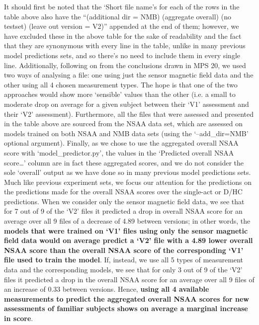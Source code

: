 \documentclass[12pt,twoside]{report}
\begin{document}
\quad It should first be noted that the ‘Short file name’s for each of the rows in the table above also have the “(additional dir = NMB) (aggregate overall) (no testset) (leave out version = V2)” appended at the end of them; however, we have excluded these in the above table for the sake of readability and the fact that they are synonymous with every line in the table, unlike in many previous model predictions sets, and so there’s no need to include them in every single line. Additionally, following on from the conclusions drawn in MPS 20, we used two ways of analysing a file: one using just the sensor magnetic field data and the other using all 4 chosen measurement types. The hope is that one of the two approaches would show more ‘sensible’ values than the other (i.e. a small to moderate drop on average for a given subject between their ‘V1’ assessment and their ‘V2’ assessment). Furthermore, all the files that were assessed and presented in the table above are sourced from the NSAA data set, which are assessed on models trained on both NSAA and NMB data sets (using the ‘--add\_dir=NMB’ optional argument). Finally, as we chose to use the aggregated overall NSAA score with ‘model\_predictor.py’, the values in the ‘Predicted overall NSAA score…’ column are in fact these aggregated scores, and we do not consider the sole ‘overall’ output as we have done so in many previous model predictions sets.\\

\quad Much like previous experiment sets, we focus our attention for the predictions on the predictions made for the overall NSAA scores over the single-act or D/HC predictions. When we consider only the sensor magnetic field data, we see that for 7 out of 9 of the ‘V2’ files it predicted a drop in overall NSAA score for an average over all 9 files of a decrease of 4.89 between versions; in other words, the \textbf{models that were trained on ‘V1’ files using only the sensor magnetic field data would on average predict a ‘V2’ file with a 4.89 lower overall NSAA score than the overall NSAA score of the corresponding ‘V1’ file used to train the model}. If, instead, we use all 5 types of measurement data and the corresponding models, we see that for only 3 out of 9 of the ‘V2’ files it predicted a drop in the overall NSAA score for an average over all 9 files of an increase of 0.33 between versions. Hence, \textbf{using all 4 available measurements to predict the aggregated overall NSAA scores for new assessments of familiar subjects shows on average a marginal increase in score}.\\
\end{document}
